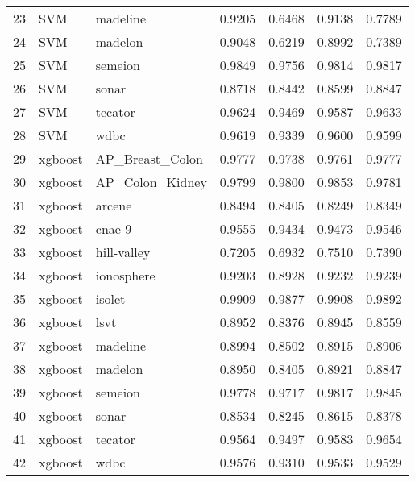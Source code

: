 \begin{table}[ht]
\begin{tabular}{rllrrrr}
  23 & SVM & madeline & 0.9205 & 0.6468 & 0.9138 & 0.7789 \\ 
  24 & SVM & madelon & 0.9048 & 0.6219 & 0.8992 & 0.7389 \\ 
  25 & SVM & semeion & 0.9849 & 0.9756 & 0.9814 & 0.9817 \\ 
  26 & SVM & sonar & 0.8718 & 0.8442 & 0.8599 & 0.8847 \\ 
  27 & SVM & tecator & 0.9624 & 0.9469 & 0.9587 & 0.9633 \\ 
  28 & SVM & wdbc & 0.9619 & 0.9339 & 0.9600 & 0.9599 \\ 
  29 & xgboost & AP\_Breast\_Colon & 0.9777 & 0.9738 & 0.9761 & 0.9777 \\ 
  30 & xgboost & AP\_Colon\_Kidney & 0.9799 & 0.9800 & 0.9853 & 0.9781 \\ 
  31 & xgboost & arcene & 0.8494 & 0.8405 & 0.8249 & 0.8349 \\ 
  32 & xgboost & cnae-9 & 0.9555 & 0.9434 & 0.9473 & 0.9546 \\ 
  33 & xgboost & hill-valley & 0.7205 & 0.6932 & 0.7510 & 0.7390 \\ 
  34 & xgboost & ionosphere & 0.9203 & 0.8928 & 0.9232 & 0.9239 \\ 
  35 & xgboost & isolet & 0.9909 & 0.9877 & 0.9908 & 0.9892 \\ 
  36 & xgboost & lsvt & 0.8952 & 0.8376 & 0.8945 & 0.8559 \\ 
  37 & xgboost & madeline & 0.8994 & 0.8502 & 0.8915 & 0.8906 \\ 
  38 & xgboost & madelon & 0.8950 & 0.8405 & 0.8921 & 0.8847 \\ 
  39 & xgboost & semeion & 0.9778 & 0.9717 & 0.9817 & 0.9845 \\ 
  40 & xgboost & sonar & 0.8534 & 0.8245 & 0.8615 & 0.8378 \\ 
  41 & xgboost & tecator & 0.9564 & 0.9497 & 0.9583 & 0.9654 \\ 
  42 & xgboost & wdbc & 0.9576 & 0.9310 & 0.9533 & 0.9529 \\ 
   \hline
\end{tabular}
\end{table}
